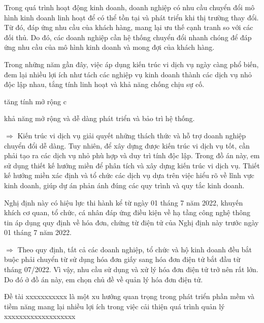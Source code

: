 Trong quá trình hoạt động kinh doanh, doanh nghiệp có nhu cầu chuyển đổi mô hình kinh doanh linh hoạt để có thể tồn tại và phát triển khi thị trường thay đổi. Từ đó, đáp ứng nhu cầu của khách hàng, mang lại ưu thế cạnh tranh so với các đối thủ. Do đó, các doanh nghiệp cần hệ thống chuyển đổi nhanh chóng để đáp ứng nhu cầu của mô hình kinh doanh và mong đợi của khách hàng.

Trong những năm gần đây, việc áp dụng kiến trúc vi dịch vụ ngày càng phổ biến,  đem lại nhiều lợi ích như  tách các nghiệp vụ kinh doanh   thành các dịch vụ nhỏ độc lập nhau, tắng tính   linh hoạt và khả năng chống chịu sự cố. 



tăng tính mở rộng c 
 
 khả năng mở rộng và dễ dàng phát triển và bảo trì hệ thống.





$\Rightarrow$ Kiến trúc vi dịch vụ giải quyết những thách thức và hỗ trợ doanh nghiệp chuyển đổi dễ dàng. Tuy nhiên, để xây dựng được kiến trúc vi dịch vụ tốt, cần phải tạo ra các dịch vụ nhỏ phù hợp và duy trì tính độc lập. Trong đồ án này, em sử dụng thiết kế hướng miền để phân tích và xây dựng kiến trúc vi dịch vụ. Thiết kế hướng miền xác định và tổ chức các dịch vụ dựa trên việc hiểu rõ về lĩnh vực kinh doanh, giúp dự án phản ánh đúng các quy trình và quy tắc kinh doanh.



Nghị định này có hiệu lực thi hành kể từ ngày 01 tháng 7 năm 2022, khuyến khích cơ quan, tổ chức, cá nhân đáp ứng điều kiện về hạ tầng công nghệ thông tin áp dụng quy định về hóa đơn, chứng từ điện tử của Nghị định này trước ngày 01 tháng 7 năm 2022.


$\Rightarrow$ Theo quy định, tất cả các doanh nghiệp, tổ chức và hộ kinh doanh đều bắt buộc phải chuyển từ sử dụng hóa đơn giấy sang hóa đơn điện tử bắt đầu từ tháng 07/2022. Vì vậy, nhu cầu sử dụng và xử lý hóa đơn điện tử trở nên rất lớn. Do đó ở đồ án này, em chọn chủ đề về quản lý hóa đơn điện tử.

Đề tài xxxxxxxxxxx là một xu hướng quan trọng trong phát triển phần mềm và tiềm năng mang lại nhiều lợi ích trong việc cải thiện quá trình quản lý xxxxxxxxxxxxxxxxxxx